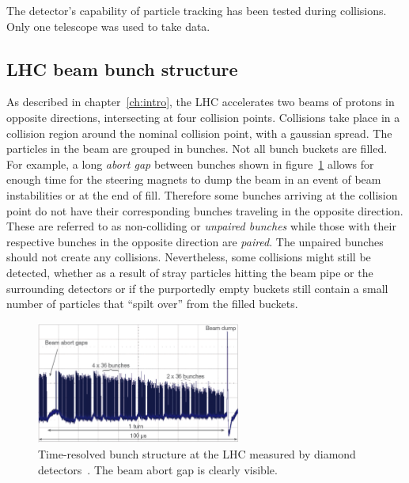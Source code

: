 
The detector's capability of particle tracking has been tested during collisions. Only one telescope was used to take data. 

\subsection{LHC beam bunch structure}
As described in chapter~\ref{ch:intro}, the LHC accelerates two beams of protons in opposite directions, intersecting at four collision points. Collisions take place in a collision region around the nominal collision point, with a gaussian spread. The particles in the beam are grouped in bunches. Not all bunch buckets are filled. For example, a long \emph{abort gap} between bunches shown in figure~\ref{fig:lhcbunch} allows for enough time for the steering magnets to dump the beam in an event of beam instabilities or at the end of fill. Therefore some bunches arriving at the collision point do not have their corresponding bunches traveling in the opposite direction. These are referred to as non-colliding or \emph{unpaired bunches} while those with their respective bunches in the opposite direction are \emph{paired}. The unpaired bunches should not create any collisions. Nevertheless, some collisions might still be detected, whether as a result of stray particles hitting the beam pipe or the surrounding detectors or if the purportedly empty buckets still contain a small number of particles that ``spilt over'' from the filled buckets.
\begin{figure}[!t]
\centering
\includegraphics[width=0.6\textwidth]{04_charge_monitoring/pics/lhcbunch}
\caption{Time-resolved bunch structure at the LHC measured by diamond detectors~\cite{GRIES:00005}. The beam abort gap is clearly visible.}
\label{fig:lhcbunch}
\end{figure}

